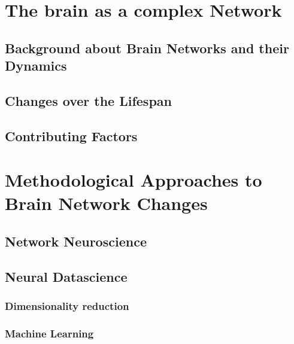 \section{The brain as a complex Network}
	\subsection{Background about Brain Networks and their Dynamics}
	\subsection{Changes over the Lifespan}
	\subsection{Contributing Factors}
\section{Methodological Approaches to Brain Network Changes}
	 \subsection{Network Neuroscience}
	 \subsection{Neural Datascience}
	 	\subsubsection{Dimensionality reduction}
	 	\subsubsection{Machine Learning}
	